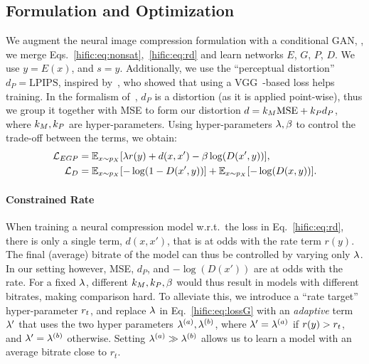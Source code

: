 \subsection{Formulation and Optimization} \label{hific:sec:formulation}

We augment the neural image compression formulation with a conditional GAN, \ie, we merge  Eqs.~\ref{hific:eq:nonsat},~\ref{hific:eq:rd} and learn networks $E$, $G$, $P$, $D$.
We use $y = E(x)$, and $s = y$.
Additionally, we use the ``perceptual distortion'' $d_P=\text{LPIPS}$, inspired by~\cite{wang2018highres}, who showed that using a VGG~\cite{simonyan2014very}-based loss helps training.
In the formalism of~\cite{blau2019rethinking}, $d_P$ is a distortion (as it is applied point-wise), thus we group it together with MSE to form our distortion $d = k_M \text{MSE} + k_P d_P$, where $k_M, k_P$ are hyper-parameters. Using hyper-parameters $\lambda, \beta$ to control the trade-off between the terms, we obtain:
\begin{align}
    \mathcal{L}_{EGP} &= \mathbb{E}_{x \sim p_X} [
                    \lambda r(y) + 
                    d(x, x')
                    -\beta \log(D(x', y)) ], \label{hific:eq:lossG} \\
    \mathcal{L}_D &= \mathbb{E}_{x \sim p_X} [
                        - \log(1 - D(x', y)) ]
                    + \mathbb{E}_{x \sim p_X} [
                        - \log(D(x, y)) ]. \label{hific:eq:lossD}
\end{align}
\paragraph{Constrained Rate} When training a neural compression model w.r.t.\ the loss in Eq.~\ref{hific:eq:rd}, there is only a single term, $d(x,x')$, that is at odds with the rate term $r(y)$. 
The final (average) bitrate of the model can thus be controlled by varying only $\lambda$.
In our setting however, MSE, $d_P$, and $-\log(D(x'))$ are at odds with the rate. For a fixed $\lambda$, different $k_M, k_P, \beta$ would thus result in models with different bitrates, making comparison hard. To alleviate this, we introduce a ``rate target'' hyper-parameter $r_t$, and replace $\lambda$ in Eq.~\ref{hific:eq:lossG} with an \emph{adaptive} term $\lambda'$ that uses the two hyper parameters $\lambda^{(a)}, \lambda^{(b)}$, where $\lambda' = \lambda^{(a)}$ if $r(y) > r_t$, and $\lambda' = \lambda^{(b)}$ otherwise.
Setting $\lambda^{(a)} \gg \lambda^{(b)}$ allows us to learn a model with an average bitrate close to $r_t$.



